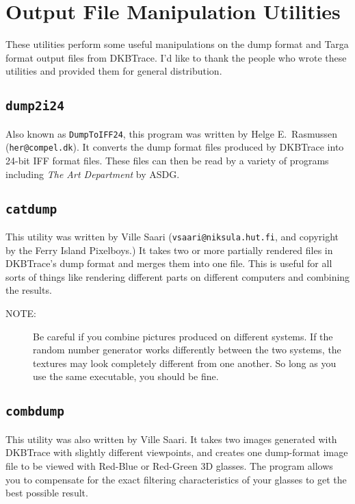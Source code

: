 \section{Output File Manipulation Utilities}

These utilities perform some useful manipulations on the dump format
and Targa
format output files from DKBTrace.  I'd like to thank the people who wrote
these utilities and provided them for general distribution.

\subsection{{\tt dump2i24}}

Also known as {\tt DumpToIFF24}, this program was written by Helge
E.\ Rasmussen ({\tt her@compel.dk}).  It converts the dump format files
produced by DKBTrace into 24-bit IFF format files.  These files can
then be read by a variety of programs including
{\em The Art Department} by ASDG.

\subsection{{\tt catdump}}

This utility was written by Ville Saari ({\tt vsaari@niksula.hut.fi},
and copyright by the Ferry Island Pixelboys.)  It takes two or more
partially rendered files in DKBTrace's dump format and merges them
into one file.  This is useful for all sorts of things like rendering
different parts on different computers and combining the results.

\begin{description}
\item[NOTE:] Be careful if you combine pictures produced on
different systems.  If the random number generator works differently
between the two systems, the textures may look completely different
from one another.  So long as you use the same executable, you should
be fine.
\end{description}

\subsection{{\tt combdump}}

This utility was also written by Ville Saari.  It takes two images generated
with DKBTrace with slightly different viewpoints, and creates one dump-format
image file to be viewed with Red-Blue or Red-Green 3D glasses.  The program
allows you to compensate for the exact filtering characteristics of your
glasses to get the best possible result.

